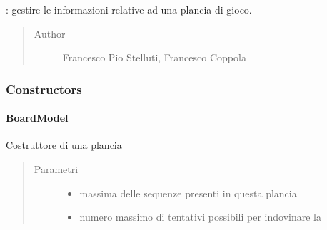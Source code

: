 \documentclass[letterpaper,10pt,italian]{sphinxmanual}
\begin{document}
\begin{fulllineitems}
\label{\detokenize{source/it/unicam/cs/pa/mastermind/gamecore/BoardModel:it.unicam.cs.pa.mastermind.gamecore.BoardModel}}
: gestire le informazioni relative ad una plancia di gioco.
\begin{quote}\begin{description}
\item[{Author}] \leavevmode
Francesco Pio Stelluti, Francesco Coppola

\end{description}\end{quote}

\end{fulllineitems}



\subsubsection{Constructors}
\label{\detokenize{source/it/unicam/cs/pa/mastermind/gamecore/BoardModel:constructors}}

\paragraph{BoardModel}
\label{\detokenize{source/it/unicam/cs/pa/mastermind/gamecore/BoardModel:id1}}

\begin{fulllineitems}
\label{\detokenize{source/it/unicam/cs/pa/mastermind/gamecore/BoardModel:it.unicam.cs.pa.mastermind.gamecore.BoardModel.BoardModel(int, int)}}
Costruttore di una plancia
\begin{quote}\begin{description}
\item[{Parametri}] \leavevmode\begin{itemize}
\item {} 
 \textendash{} massima delle sequenze presenti in questa plancia

\item {} 
 \textendash{} numero massimo di tentativi possibili per indovinare la 

\end{itemize}

\end{description}\end{quote}

\end{fulllineitems}
\end{document}
